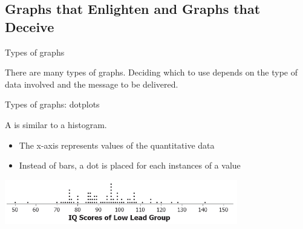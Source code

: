 \documentclass{beamer}
\begin{document}
\subsection{Graphs that Enlighten and Graphs that Deceive}

\begin{frame}{Types of graphs}

\begin{block}{}
\large
There are many types of graphs. Deciding which to use depends on the type of data involved and the message to be delivered.
\end{block}
\end{frame}

\begin{frame}{Types of graphs: dotplots}
\begin{block}{}
A  is similar to a histogram. 
\begin{itemize}
\item The x-axis represents values of the quantitative data
\item Instead of bars, a dot is placed for each instances of a value
\end{itemize}
\end{block}
\bigskip
{\centering
\includegraphics[width=4in]{../images/ch02_dotplot}
\par}
\end{frame}
\end{document}
